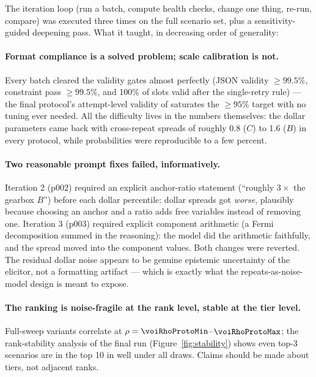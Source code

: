 
The iteration loop (run a batch, compute health checks, change one thing,
re-run, compare) was executed three times on the full scenario set, plus a
sensitivity-guided deepening pass. What it taught, in decreasing order of
generality:

\paragraph{Format compliance is a solved problem; scale calibration is not.}
Every batch cleared the validity gates almost perfectly (JSON validity
$\geq 99.5\%$, constraint pass $\geq 99.5\%$, and 100\% of slots valid after
the single-retry rule) --- the final protocol's attempt-level validity of
\voiValidityRate{} saturates the $\geq 95\%$ target with no tuning ever
needed. All the difficulty lives in the numbers themselves: the dollar
parameters came back with cross-repeat spreads of roughly 0.8 ($C$) to 1.6
($B$) in every protocol, while probabilities were reproducible to a few
percent.

\paragraph{Two reasonable prompt fixes failed, informatively.} Iteration 2
(p002) required an explicit anchor-ratio statement (``roughly $3\times$ the
gearbox $B$'') before each dollar percentile: dollar spreads got
\emph{worse}, plausibly because choosing an anchor and a ratio adds free
variables instead of removing one. Iteration 3 (p003) required explicit
component arithmetic (a Fermi decomposition summed in the reasoning): the
model did the arithmetic faithfully, and the spread moved into the component
values. Both changes were reverted. The residual dollar noise appears to be
genuine epistemic uncertainty of the elicitor, not a formatting artifact ---
which is exactly what the repeats-as-noise-model design is meant to expose.

\paragraph{The ranking is noise-fragile at the rank level, stable at the tier
level.} Full-sweep variants correlate at
$\rho = \voiRhoProtoMin$--$\voiRhoProtoMax$; the rank-stability analysis of
the final run (Figure~\ref{fig:stability}) shows even top-3 scenarios are in
the top 10 in well under all draws. Claims should be made about tiers, not
adjacent ranks.


